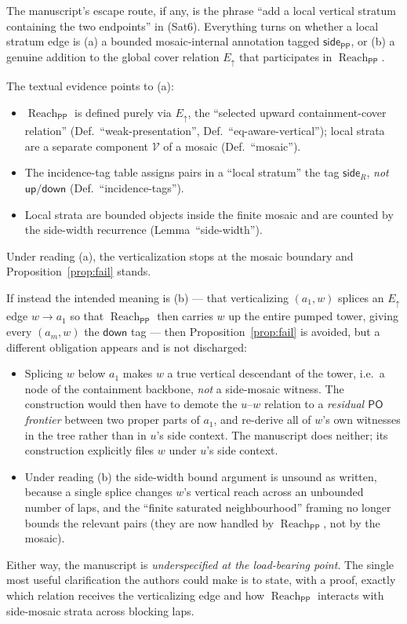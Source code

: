 \documentclass[11pt]{article}
\newcommand{\PO}{\mathsf{PO}}
\newcommand{\PP}{\mathsf{PP}}
\newcommand{\reach}{\operatorname{Reach}}
\newcommand{\Eup}{E_{\uparrow}}
\newcommand{\up}{\mathsf{up}}
\newcommand{\down}{\mathsf{down}}
\newcommand{\sidetag}{\mathsf{side}}
\begin{document}
The manuscript's escape route, if any, is the phrase ``add a local vertical
stratum containing the two endpoints'' in (Sat6).  Everything turns on whether a
local stratum edge is (a) a bounded mosaic-internal annotation tagged
$\sidetag_{\PP}$, or (b) a genuine addition to the global cover relation $\Eup$
that participates in $\reach_{\PP}$.

The textual evidence points to (a):
\begin{itemize}
\item $\reach_{\PP}$ is defined purely via $\Eup$, the ``selected upward
containment-cover relation'' (Def.~``weak-presentation'',
Def.~``eq-aware-vertical''); local strata are a separate component $\mathcal V$
of a mosaic (Def.~``mosaic'').
\item The incidence-tag table assigns pairs in a ``local stratum'' the tag
$\sidetag_R$, \emph{not} $\up/\down$ (Def.~``incidence-tags'').
\item Local strata are bounded objects inside the finite mosaic and are counted
by the side-width recurrence (Lemma~``side-width'').
\end{itemize}
Under reading (a), the verticalization stops at the mosaic boundary and
Proposition~\ref{prop:fail} stands.

If instead the intended meaning is (b) --- that verticalizing $(a_1,w)$ splices
an $\Eup$ edge $w\to a_1$ so that $\reach_{\PP}$ then carries $w$ up the entire
pumped tower, giving every $(a_m,w)$ the $\down$ tag --- then
Proposition~\ref{prop:fail} is avoided, but a different obligation appears and
is not discharged:
\begin{itemize}
\item Splicing $w$ below $a_1$ makes $w$ a true vertical descendant of the
tower, i.e.\ a node of the containment backbone, \emph{not} a side-mosaic
witness.  The construction would then have to demote the $u$--$w$ relation to a
\emph{residual $\PO$ frontier} between two proper parts of $a_1$, and re-derive
all of $w$'s own witnesses in the tree rather than in $u$'s side context.  The
manuscript does neither; its construction explicitly files $w$ under $u$'s side
context.
\item Under reading (b) the side-width bound argument is unsound as written,
because a single splice changes $w$'s vertical reach across an unbounded number
of laps, and the ``finite saturated neighbourhood'' framing no longer bounds the
relevant pairs (they are now handled by $\reach_{\PP}$, not by the mosaic).
\end{itemize}
Either way, the manuscript is \emph{underspecified at the load-bearing point}.
The single most useful clarification the authors could make is to state, with a
proof, exactly which relation receives the verticalizing edge and how
$\reach_{\PP}$ interacts with side-mosaic strata across blocking laps.
\end{document}

